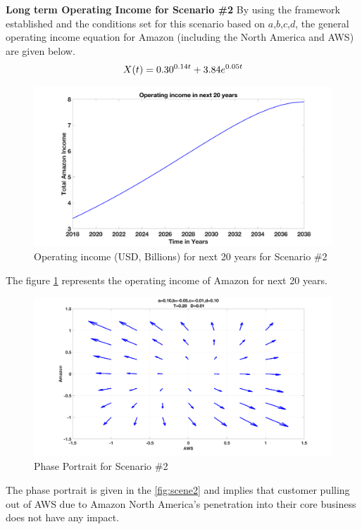 \documentclass[fleqn,10pt]{SelfArx} %
\begin{document}
\textbf{Long term Operating Income for Scenario \#2}
By using the framework established and the conditions set for this scenario based on $a$,$b$,$c$,$d$, the general operating income equation for Amazon (including the North America and AWS) are given below. 
\begin{equation} \centering
X(t) = 0.30^{0.14 t} + 3.84 e^{0.05 t}
\label{eq:s2}
\end{equation}

\begin{figure}[ht]\centering
\includegraphics[width=\linewidth]{scen2income}
\caption{Operating income (USD, Billions) for next 20 years for Scenario \#2}
\label{fig:scen2income}
\end{figure}

The figure \ref{fig:scen2income} represents the operating income of Amazon for next 20 years. 


\begin{figure}[ht]\centering
\includegraphics[width=\linewidth]{scen2}
\caption{Phase Portrait for Scenario \#2}
\label{fig:scen2}
\end{figure}
The phase portrait is given in the \ref{fig:scene2} and implies that customer pulling out of AWS due to Amazon North America's penetration into their core business does not have any impact.
\end{document}
